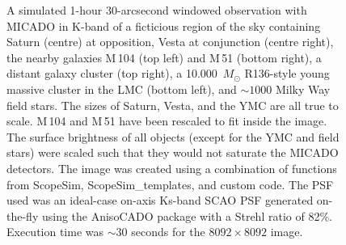 \documentclass[a4paper,twoside,11pt]{article}
\begin{document}
\begin{figure}

\caption{A simulated 1-hour 30-arcsecond windowed observation with
  MICADO in K-band of a ficticious region of the sky containing Saturn
  (centre) at opposition, Vesta at conjunction (centre right), the
  nearby galaxies M\,104 (top left) and M\,51 (bottom right), a
  distant galaxy cluster (top right), a 10.000~$M_{\odot}$ R136-style
  young massive cluster in the LMC (bottom left), and $\sim 1000$
  Milky Way field stars.  The sizes of Saturn, Vesta, and the YMC are
  all true to scale.  M\,104 and M\,51 have been rescaled to fit
  inside the image.  The surface brightness of all objects (except for
  the YMC and field stars) were scaled such that they would not
  saturate the MICADO detectors.  The image was created using a
  combination of functions from ScopeSim, ScopeSim\_templates, and
  custom code.  The PSF used was an ideal-case on-axis Ks-band SCAO
  PSF generated on-the-fly using the AnisoCADO package with a Strehl
  ratio of 82\%.  Execution time was $\sim 30$ seconds for the
  $8092\times8092$ image.  }
\label{fig-title-page}

\end{figure}



\setcounter{tocdepth}{3}
\tableofcontents
\cleardoublepage






\end{document}
